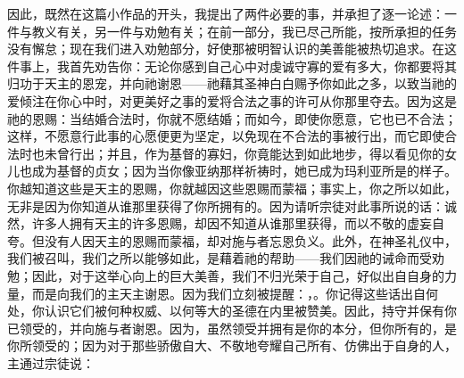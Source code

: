 因此，既然在这篇小作品的开头，我提出了两件必要的事，并承担了逐一论述：一件与教义有关，另一件与劝勉有关；在前一部分，我已尽己所能，按所承担的任务没有懈怠；现在我们进入劝勉部分，好使那被明智认识的美善能被热切追求。在这件事上，我首先劝告你：无论你感到自己心中对虔诚守寡的爱有多大，你都要将其归功于天主的恩宠，并向祂谢恩——祂藉其圣神白白赐予你如此之多，以致当祂的爱倾注在你心中时，对更美好之事的爱将合法之事的许可从你那里夺去。因为这是祂的恩赐：当结婚合法时，你就不愿结婚；而如今，即使你愿意，它也已不合法；这样，不愿意行此事的心愿便更为坚定，以免现在不合法的事被行出，而它即使合法时也未曾行出；并且，作为基督的寡妇，你竟能达到如此地步，得以看见你的女儿也成为基督的贞女；因为当你像亚纳那样祈祷时，她已成为玛利亚所是的样子。你越知道这些是天主的恩赐，你就越因这些恩赐而蒙福；事实上，你之所以如此，无非是因为你知道从谁那里获得了你所拥有的。因为请听宗徒对此事所说的话：诚然，许多人拥有天主的许多恩赐，却因不知道从谁那里获得，而以不敬的虚妄自夸。但没有人因天主的恩赐而蒙福，却对施与者忘恩负义。此外，在神圣礼仪中，我们被召叫，我们之所以能够如此，是藉着祂的帮助——我们因祂的诫命而受劝勉；因此，对于这举心向上的巨大美善，我们不归光荣于自己，好似出自自身的力量，而是向我们的主天主谢恩。因为我们立刻被提醒：，。你记得这些话出自何处，你认识它们被何种权威、以何等大的圣德在内里被赞美。因此，持守并保有你已领受的，并向施与者谢恩。因为，虽然领受并拥有是你的本分，但你所有的，是你所领受的；因为对于那些骄傲自大、不敬地夸耀自己所有、仿佛出于自身的人，主通过宗徒说：\par


